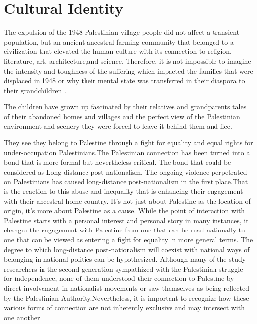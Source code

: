 \section{Cultural Identity}
 
The expulsion of the 1948 Palestinian village people did not affect a transient population, but an ancient ancestral farming community that belonged to a civilization that elevated the human culture with its connection to religion, literature, art, architecture,and science. Therefore, it is not impossible to imagine the intensity and toughness of the suffering which impacted the families that were displaced in 1948 or why their mental state was transferred in their diaspora to their grandchildren \citep{Khalidi2015}.
 
 The children have grown up fascinated by their relatives and grandparents tales of their abandoned homes and villages and the perfect view of the Palestinian environment and scenery they were forced to leave it behind them and flee.

They see they belong to Palestine through a fight for equality and equal rights for under-occupation Palestinians.The Palestinian connection has been turned into a bond that is more formal but nevertheless critical. The bond that could be considered as Long-distance post-nationalism. The ongoing violence perpetrated on Palestinians has caused long-distance post-nationalism in the first place.That is the reaction to this abuse and inequality that is enhancing their engagement with their ancestral home country. It's not just about Palestine as the location of origin, it's more about Palestine as a cause. While the point of interaction with Palestine starts with a personal interest and personal story in many instances, it changes the engagement with Palestine from one that can be read nationally to one that can be viewed as entering a fight for equality in more general terms.
The degree to which long-distance post-nationalism will coexist with national ways of belonging in national politics can be hypothesized. Although many of the study researchers in the second generation sympathized with the Palestinian struggle for independence, none of them understood their connection to Palestine by direct involvement in nationalist movements or saw themselves as being reflected by the Palestinian Authority.Nevertheless, it is important to recognize how these various forms of connection are not inherently exclusive and may intersect with one another \citep{Blachnicka-Ciacek2018}.

